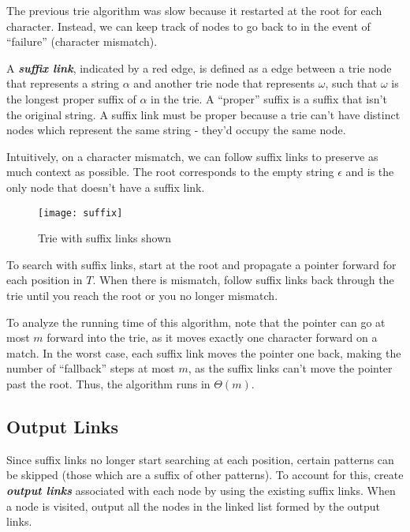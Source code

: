 \documentclass[11pt, oneside]{article}
\newcommand{\emphasis}[1]{\textbf{\textit{#1}}}
\begin{document}
The previous trie algorithm was slow because it restarted at the root for each character.
Instead, we can keep track of nodes to go back to in the event of ``failure'' (character mismatch).

A \textbf{\textit{suffix link}}, indicated by a red edge, is defined as a edge between a trie node that represents a string \( \alpha \)
and another trie node that represents \( \omega \), such that \( \omega \)
is the longest proper suffix of \( \alpha \) in the trie. A ``proper'' suffix
is a suffix that isn't the original string. A suffix link must be proper because a trie can't have
distinct nodes which represent the same string - they'd occupy the same node.

Intuitively, on a character mismatch, we can follow suffix links to preserve as much context as possible.
The root corresponds to the empty string \( \epsilon \) and is the only node that doesn't have a suffix link.

\begin{figure}[h!]
\centering
\texttt{[image: suffix]}
\caption{Trie with suffix links shown}
\end{figure}

To search with suffix links, start at the root and propagate a pointer
forward for each position in \( T \). When there is mismatch, follow suffix links back through the trie until you reach the root
or you no longer mismatch.

To analyze the running time of this algorithm, note that the pointer can go
at most \( m \) forward into the trie, as it moves exactly one character forward on a match.
In the worst case, each suffix link moves the pointer one back, making the
number of ``fallback'' steps at most \( m \), as the suffix links can't move the pointer past the root.
Thus, the algorithm runs in \( \Theta(m) \).

\newpage

\subsection{Output Links}

Since suffix links no longer start searching at each position,
certain patterns can be skipped (those which are a suffix of other patterns).
To account for this, create \emphasis{output links} associated with each node by using
the existing suffix links.
When a node is visited, output all the nodes in the linked list formed by the output links.
\end{document}
